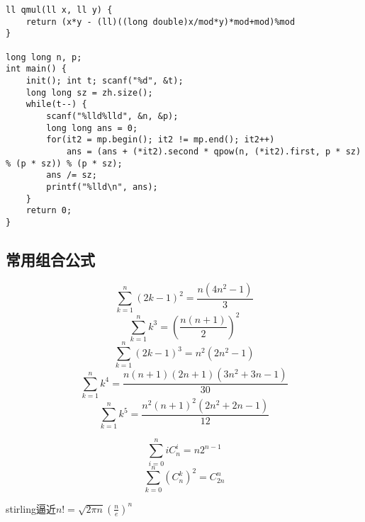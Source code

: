 \begin{lstlisting}
ll qmul(ll x, ll y) {
    return (x*y - (ll)((long double)x/mod*y)*mod+mod)%mod
}

long long n, p;
int main() {
    init(); int t; scanf("%d", &t);
    long long sz = zh.size();
    while(t--) {
        scanf("%lld%lld", &n, &p);
        long long ans = 0;
        for(it2 = mp.begin(); it2 != mp.end(); it2++)
            ans = (ans + (*it2).second * qpow(n, (*it2).first, p * sz) % (p * sz)) % (p * sz);
        ans /= sz;
        printf("%lld\n", ans);
    }
    return 0;
}
\end{lstlisting}


\subsection{常用组合公式}

$$
\sum_{k=1}^n (2k-1)^2 = \frac{n(4n^2-1)}{3} 
$$
$$
\sum_{k=1}^n k^3 = (\frac{n(n+1)}{2})^2
$$
$$
\sum_{k=1}^n (2k-1)^3 = n^2(2n^2-1)
$$
$$
\sum_{k=1}^n k^4 = \frac{n(n+1)(2n+1)(3n^2+3n-1)}{30}
$$
$$
\sum_{k=1}^n k^5 = \frac{n^2(n+1)^2(2n^2+2n-1)}{12}
$$


$$
\sum_{i=0}^n iC^i_n = n 2^{n-1}
$$
$$
\sum_{k=0}^n (C_n^k)^2 = C^n_{2n}
$$

stirling逼近$n! = \sqrt{2\pi n} (\frac{n}{e})^n$

